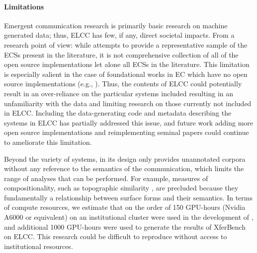 \paragraph{Limitations}
Emergent communication research is primarily basic research on machine generated data; thus, ELCC has few, if any, direct societal impacts.
From a research point of view:
  while \theLib{} attempts to provide a representative sample of the ECSs present in the literature, it is not comprehensive collection of all of the open source implementations let alone all ECSs in the literature.
This limitation is especially salient in the case of foundational works in EC which have no open source implementations (e.g., \citet{mordatch2018grounded}).
Thus, the contents of ELCC could potentially result in an over-reliance on the particular systems included resulting in an unfamiliarity with the data and limiting research on those currently not included in ELCC\@.
Including the data-generating code and metadata describing the systems in ELCC has partially addressed this issue, and future work adding more open source implementations and reimplementing seminal papers could continue to ameliorate this limitation.

Beyond the variety of systems, in its design \theLib{} only provides unannotated corpora without any reference to the semantics of the communication, which limits the range of analyses that can be performed.
For example, measures of compositionality, such as topographic similarity \citep{brighton2006UnderstandingLE,lazaridou2018referential}, are precluded because they fundamentally a relationship between surface forms and their semantics.
In terms of compute resources, we estimate that on the order of 150 GPU-hours (Nvidia A6000 or equivalent) on an institutional cluster were used in the development of \theLib{}, and additional 1000 GPU-hours were used to generate the results of XferBench on ELCC\@.
This research could be difficult to reproduce without access to institutional resources.


% 




